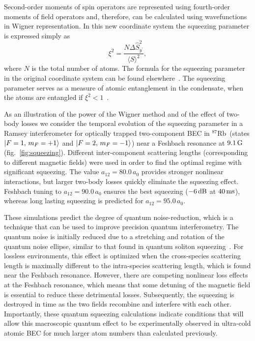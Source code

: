 \documentclass[doublecol]{epl2}
\newcommand{\Rb}{$^{87}$Rb}
\newcommand{\figref}[1]{fig.~\ref{#1}}
\newcommand{\ket}[1]{\mbox{\ensuremath{\vert #1 \rangle}}}
\begin{document}
Second-order moments of spin operators are represented using fourth-order moments of field operators
and, therefore, can be calculated using wavefunctions in Wigner representation.
In this new coordinate system the squeezing parameter is expressed simply as
\begin{equation}
\label{eqn:squeezing}
	\xi^2 = \frac{N \Delta \hat{S}^2_{y^\prime}}{\langle S \rangle^2},
\end{equation}
where $N$ is the total number of atoms.
The formula for the squeezing parameter in the original coordinate system can be found elsewhere~\cite{Li2009}.
The squeezing parameter serves as a measure of atomic entanglement in the condensate,
when the atoms are entangled if $\xi^2 < 1$~\cite{Sorensen2001}.

As an illustration of the power of the Wigner method and of the effect of two-body losses we consider the temporal evolution of the squeezing parameter in a Ramsey interferometer for optically trapped two-component BEC in \Rb\ (states ${\ket{F=1,\, m_F=+1}}$ and ${\ket{F=2,\, m_F=-1}}$) near a Feshbach resonance at $9.1\un{G}$ (\figref{fig:squeezing}).
Different inter-component scattering lengths (corresponding to different magnetic fields)
were used in order to find the optimal regime with significant squeezing.
The value $a_{12} = 80.0\,a_0$ provides stronger nonlinear interactions, but larger two-body losses quickly eliminate the squeezing effect.
Feshbach tuning to $a_{12} = 90.0\,a_0$ ensures the best squeezing ($-6\un{dB}$ at $40\un{ms}$), whereas long lasting squeezing is predicted for $a_{12} = 95.0\,a_0$.

These simulations predict the degree of quantum noise-reduction, which
is a technique that can be used to improve precision quantum interferometry.
The quantum noise is initially reduced due to a stretching and rotation
of the quantum noise ellipse, similar to that found in quantum soliton
squeezing~\cite{Carter1987,Drummond1993a}.
For lossless environments, this effect is optimized when the cross-species
scattering length is maximally different to the intra-species scattering
length, which is found near the Feshbach resonance.
However, there are competing nonlinear loss effects at the Feshbach resonance,
which means that some detuning of the magnetic field is essential to reduce
these detrimental losses.
Subsequently, the squeezing is destroyed in time as the two fields recombine
and interfere with each other.
Importantly, these quantum squeezing calculations indicate conditions that
will allow this macroscopic quantum effect to be experimentally
observed in ultra-cold atomic BEC for much larger atom
numbers than calculated previously.
\end{document}
